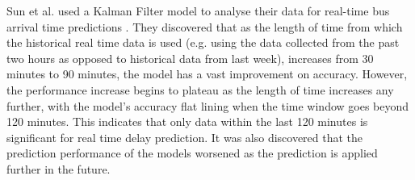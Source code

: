 Sun et al. used a Kalman Filter model to analyse their data for real-time bus arrival time predictions \cite{smart-public-transport}. They discovered that as the length of time from which the historical real time data is used (e.g. using the data collected from the past two hours as opposed to historical data from last week), increases from 30 minutes to 90 minutes, the model has a vast improvement on accuracy. However, the performance increase begins to plateau as the length of time increases any further, with the model's accuracy flat lining when the time window goes beyond 120 minutes. This indicates that only data within the last 120 minutes is significant for real time delay prediction. It was also discovered that the prediction performance of the models worsened as the prediction is applied further in the future. 

